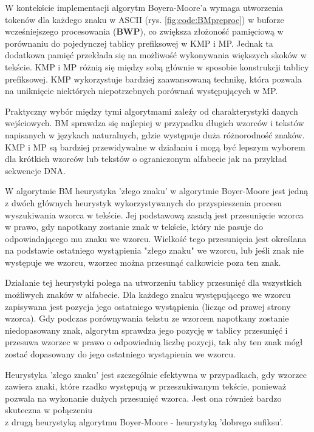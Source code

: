 W kontekście implementacji algorytm Boyera-Moore'a wymaga utworzenia tokenów dla
każdego znaku w ASCII (rys. \ref{fig:code:BMpreproc}) w buforze wcześniejszego 
procesowania (\textbf{BWP}), co zwiększa złożoność pamięciową w porównaniu do pojedynczej 
tablicy prefiksowej w KMP i MP. Jednak ta dodatkowa pamięć przekłada się na 
możliwość wykonywania większych skoków w tekście. KMP i MP różnią się między 
sobą głównie w sposobie konstrukcji tablicy prefiksowej. KMP wykorzystuje 
bardziej zaawansowaną technikę, która pozwala na uniknięcie niektórych 
niepotrzebnych porównań występujących w MP.

Praktyczny wybór między tymi algorytmami zależy od charakterystyki danych
wejściowych. BM sprawdza się najlepiej w przypadku długich wzorców i tekstów
napisanych w językach naturalnych, gdzie występuje duża różnorodność znaków.
KMP i MP są bardziej przewidywalne w działaniu i mogą być lepszym wyborem dla 
krótkich wzorców lub tekstów o ograniczonym alfabecie jak na przykład sekwencje
DNA.

W algorytmie BM heurystyka 'złego znaku' w algorytmie Boyer-Moore jest jedną \\ z
dwóch głównych heurystyk wykorzystywanych do przyspieszenia procesu wyszukiwania
wzorca w tekście. Jej podstawową zasadą jest przesunięcie wzorca w prawo, gdy 
napotkany zostanie znak w tekście, który nie pasuje do odpowiadającego mu znaku 
we wzorcu. Wielkość tego przesunięcia jest określana na podstawie ostatniego 
wystąpienia "złego znaku" we wzorcu, lub jeśli znak nie występuje we wzorcu,
wzorzec można przesunąć całkowicie poza ten znak.

Działanie tej heurystyki polega na utworzeniu tablicy przesunięć dla wszystkich 
możliwych znaków w alfabecie. Dla każdego znaku występującego we wzorcu 
zapisywana jest pozycja jego ostatniego wystąpienia (licząc od prawej strony 
wzorca). Gdy podczas porównywania tekstu ze wzorcem napotkany zostanie 
niedopasowany znak, algorytm sprawdza jego pozycję w tablicy przesunięć i 
przesuwa wzorzec w prawo o odpowiednią liczbę pozycji, tak aby ten znak mógł 
zostać dopasowany do jego ostatniego wystąpienia we wzorcu.

Heurystyka 'złego znaku' jest szczególnie efektywna w przypadkach, gdy 
wzorzec zawiera znaki, które rzadko występują w przeszukiwanym tekście, ponieważ 
pozwala na wykonanie dużych przesunięć wzorca. Jest ona również bardzo skuteczna
w połączeniu \\ z drugą heurystyką algorytmu Boyer-Moore - heurystyką 'dobrego 
sufiksu'.

